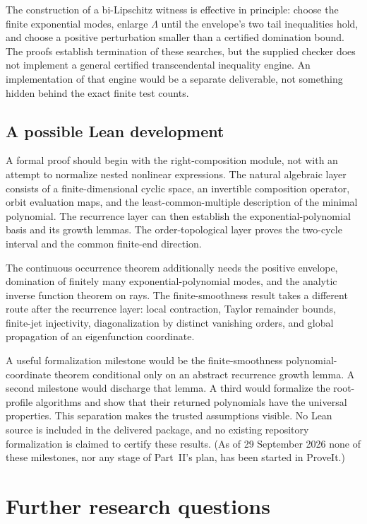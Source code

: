 \documentclass[11pt,letterpaper]{article}
\theoremstyle{definition}
\theoremstyle{remark}
\begin{document}
The construction of a bi-Lipschitz witness is effective in principle:
choose the finite exponential modes, enlarge $\Lambda$ until the envelope's
two tail inequalities hold, and choose a positive perturbation smaller
than a certified domination bound. The proofs establish termination of
these searches, but the supplied checker does not implement a general
certified transcendental inequality engine. An implementation of that
engine would be a separate deliverable, not something hidden behind
the exact finite test counts.

\subsection{A possible Lean development}

A formal proof should begin with the right-composition module, not
with an attempt to normalize nested nonlinear expressions. The
natural algebraic layer consists of a finite-dimensional cyclic space,
an invertible composition operator, orbit evaluation maps, and the
least-common-multiple description of the minimal polynomial.
The recurrence layer can then establish the exponential-polynomial
basis and its growth lemmas. The order-topological layer proves the
two-cycle interval and the common finite-end direction.

The continuous occurrence theorem additionally needs the positive
envelope, domination of finitely many exponential-polynomial modes,
and the analytic inverse function theorem on rays. The finite-smoothness
result takes a different route after the recurrence layer: local
contraction, Taylor remainder bounds, finite-jet injectivity,
diagonalization by distinct vanishing orders, and global propagation
of an eigenfunction coordinate.

A useful formalization milestone would be the finite-smoothness
polynomial-coordinate theorem conditional only on an abstract
recurrence growth lemma. A second milestone would discharge that
lemma. A third would formalize the root-profile algorithms and show
that their returned polynomials have the universal properties. This
separation makes the trusted assumptions visible. No Lean source is
included in the delivered package, and no existing repository formalization
is claimed to certify these results. (As of 29 September 2026 none of these
milestones, nor any stage of Part~II's plan, has been started in ProveIt.)

\section{Further research questions}
\label{nrr:dc:sec:research}
\end{document}
